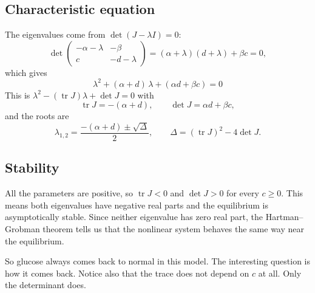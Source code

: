 \documentclass[11pt,a4paper]{article}
\begin{document}
\subsection{Characteristic equation}
The eigenvalues come from $\det(J-\lambda I)=0$:
\[
\det\begin{pmatrix}-\alpha-\lambda & -\beta\\ c & -d-\lambda\end{pmatrix}
=(\alpha+\lambda)(d+\lambda)+\beta c = 0,
\]
which gives
\begin{equation}\label{eq:char}
\boxed{\;\lambda^2 + (\alpha+d)\,\lambda + (\alpha d + \beta c) = 0\;}
\end{equation}
This is $\lambda^2-(\operatorname{tr}J)\lambda+\det J=0$ with
\begin{equation}
\operatorname{tr}J = -(\alpha+d),\qquad \det J = \alpha d+\beta c,
\end{equation}
and the roots are
\begin{equation}\label{eq:roots}
\lambda_{1,2} = \frac{-(\alpha+d) \pm \sqrt{\Delta}}{2},\qquad \Delta=(\operatorname{tr}J)^2-4\det J .
\end{equation}

\subsection{Stability}
All the parameters are positive, so $\operatorname{tr}J<0$ and $\det J>0$ for every $c\ge0$. This means both eigenvalues have negative real parts and the equilibrium is asymptotically stable. Since neither eigenvalue has zero real part, the Hartman--Grobman theorem \cite{boyce} tells us that the nonlinear system behaves the same way near the equilibrium.

So glucose always comes back to normal in this model. The interesting question is how it comes back. Notice also that the trace does not depend on $c$ at all. Only the determinant does.
\end{document}
